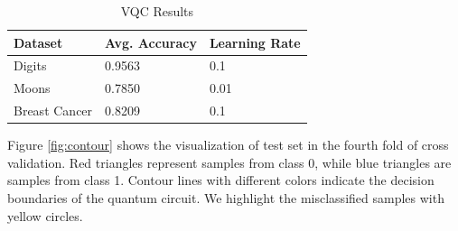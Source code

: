 \documentclass[sigconf]{acmart}
\begin{document}
\begin{table}[!ht]
    \centering
    \caption{VQC Results}
    \label{tab:vqc-results}
    \begin{tabular}{lll}
        \toprule
        \textbf{Dataset} & \textbf{Avg. Accuracy} & \textbf{Learning Rate}\\
        \midrule
        Digits & 0.9563 & 0.1\\
        Moons & 0.7850 & 0.01\\
        Breast Cancer & 0.8209 & 0.1\\
        \bottomrule
    \end{tabular}
\end{table}

Figure \ref{fig:contour} shows the visualization of test set in the fourth fold of cross validation. Red triangles represent samples from class 0, while blue triangles are samples from class 1. Contour lines with different colors indicate the decision boundaries of the quantum circuit. We highlight the misclassified samples with yellow circles.
\end{document}
